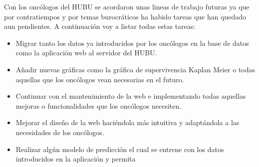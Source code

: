 Con los oncólogos del HUBU se acordaron unas lineas de trabajo futuras ya que por contratiempos y por temas burocráticos ha habido tareas que han quedado aun pendientes. A continuación voy a listar todas estas tareas:

\begin{itemize}
    \item Migrar tanto los datos ya introducidos por los oncólogos en la base de datos como la aplicación web al servidor del HUBU. 
    \item Añadir nuevas gráficas como la gráfica de supervivencia Kaplan Meier \cite{kaplan} o todas aquellas que los oncólogos vean necesarias en el futuro.
    \item Continuar con el mantenimiento de la web e implementando todas aquellas mejoras o funcionalidades que los oncólogos necesiten.
    \item Mejorar el diseño de la web haciéndola más intuitiva y adaptándola a las necesidades de los oncólogos.
    \item Realizar algún modelo de predicción el cual se entrene con los datos introducidos en la aplicación y permita 
\end{itemize}
